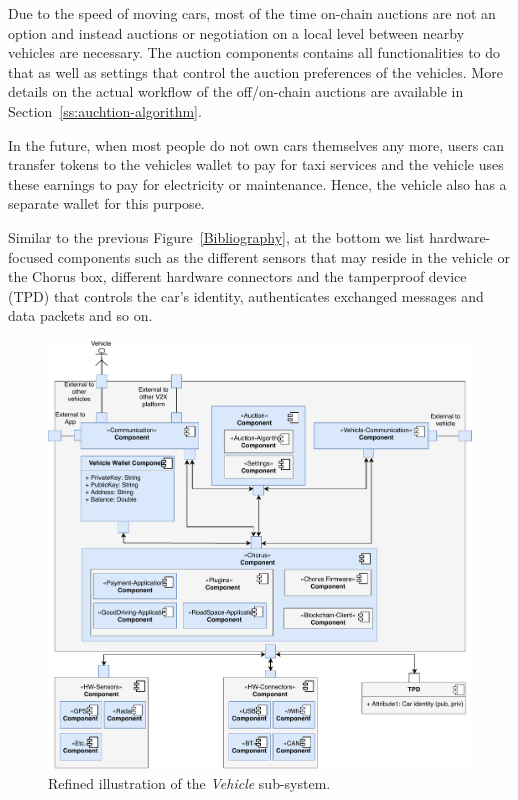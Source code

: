 \documentclass{llncs}
\begin{document}
{				Due to the speed of moving cars, most of the time on-chain auctions are not an option and instead auctions or negotiation on a local level between nearby vehicles are necessary. The auction components contains all functionalities to do that as well as settings that control the auction preferences of the vehicles. More details on the actual workflow of the off/on-chain auctions are available in Section~\ref{ss:auchtion-algorithm}.
							
				In the future, when most people do not own cars themselves any more, users can transfer tokens to the vehicles wallet to pay for taxi services and the vehicle uses these earnings to pay for electricity or maintenance. Hence, the vehicle also has a separate wallet for this purpose.
				
				Similar to the previous Figure~\ref{Bibliography}, at the bottom we list hardware-focused components such as the different sensors that may reside in the vehicle or the Chorus box, different hardware connectors and the tamperproof device (TPD) that controls the car's identity, authenticates exchanged messages and data packets and so on.
				
				\begin{figure}
					\centering
					\includegraphics[scale=0.65]{Figures/longterm-architecture/20180507_Refined-sys-architecture--vehicle.pdf}
					\caption{Refined illustration of the \textit{Vehicle} sub-system.}	
					\label{fig:system-architecture--vehicle}
				\end{figure}
				
}
\end{document}
